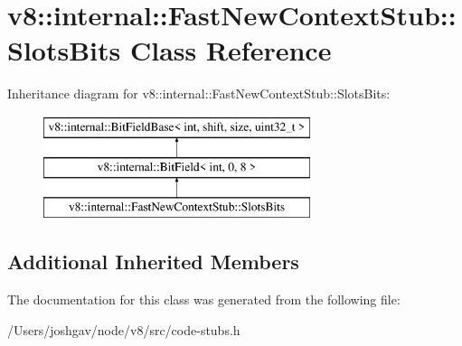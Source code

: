 \hypertarget{classv8_1_1internal_1_1_fast_new_context_stub_1_1_slots_bits}{}\section{v8\+:\+:internal\+:\+:Fast\+New\+Context\+Stub\+:\+:Slots\+Bits Class Reference}
\label{classv8_1_1internal_1_1_fast_new_context_stub_1_1_slots_bits}
Inheritance diagram for v8\+:\+:internal\+:\+:Fast\+New\+Context\+Stub\+:\+:Slots\+Bits\+:\begin{figure}[H]
\begin{center}
\leavevmode
\includegraphics[height=3.000000cm]{classv8_1_1internal_1_1_fast_new_context_stub_1_1_slots_bits}
\end{center}
\end{figure}
\subsection*{Additional Inherited Members}


The documentation for this class was generated from the following file\+:\begin{DoxyCompactItemize}
\item 
/\+Users/joshgav/node/v8/src/code-\/stubs.\+h\end{DoxyCompactItemize}
